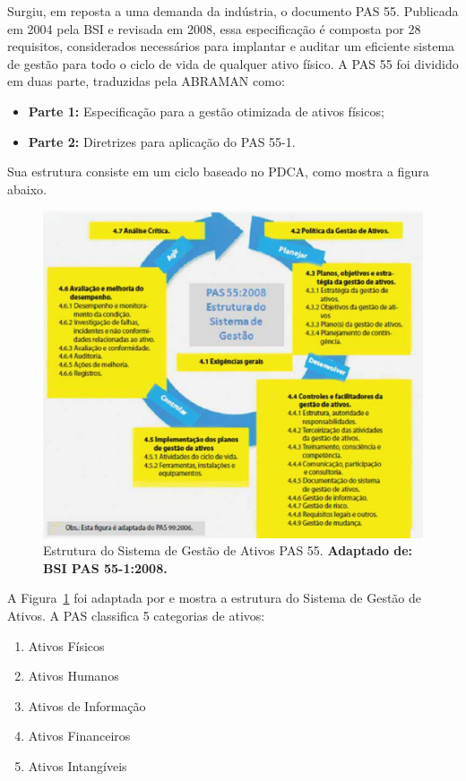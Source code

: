 Surgiu, em reposta a uma demanda da indústria, o documento PAS 55. Publicada em 2004 pela BSI e revisada em 2008, essa especificação é composta por 28 requisitos, considerados necessários para implantar e auditar um eficiente sistema de gestão para todo o ciclo de vida de qualquer ativo físico. A PAS 55 foi dividido em duas parte, traduzidas pela ABRAMAN como:

\begin{itemize}
	\item \textbf{Parte 1:} Especificação para a gestão otimizada de ativos físicos;
	\item \textbf{Parte 2:} Diretrizes para aplicação do PAS 55-1. 
\end{itemize} 

Sua estrutura consiste em um ciclo baseado no PDCA, como mostra a figura abaixo.

\graphicspath{{figuras/}}
\begin{figure}[H]
\centering
\includegraphics[width=1.0\textwidth]{pas55}
\caption{Estrutura do Sistema de Gestão de Ativos PAS 55. \textbf{Adaptado de: BSI PAS 55-1:2008.}}
\label{estrutura_pas_55}
\end{figure}

A Figura~\ref{estrutura_pas_55} foi adaptada por \cite{valeria2013} e mostra a estrutura do Sistema de Gestão de Ativos. A PAS classifica 5 categorias de ativos:

\begin{enumerate}
	\item{Ativos Físicos}
	\item{Ativos Humanos}
	\item{Ativos de Informação}
	\item{Ativos Financeiros}
	\item{Ativos Intangíveis}
\end{enumerate}

